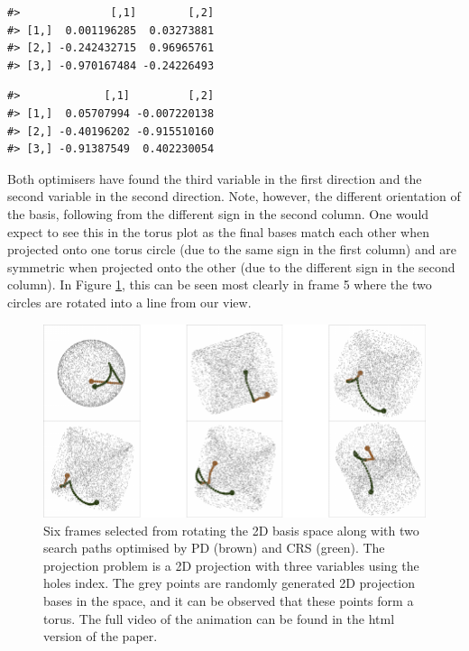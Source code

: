 \begin{verbatim}
#>              [,1]        [,2]
#> [1,]  0.001196285  0.03273881
#> [2,] -0.242432715  0.96965761
#> [3,] -0.970167484 -0.24226493
\end{verbatim}

\begin{verbatim}
#>             [,1]         [,2]
#> [1,]  0.05707994 -0.007220138
#> [2,] -0.40196202 -0.915510160
#> [3,] -0.91387549  0.402230054
\end{verbatim}

Both optimisers have found the third variable in the first direction and the second variable in the second direction. Note, however, the different orientation of the basis, following from the different sign in the second column. One would expect to see this in the torus plot as the final bases match each other when projected onto one torus circle (due to the same sign in the first column) and are symmetric when projected onto the other (due to the different sign in the second column). In Figure \ref{fig:toy-torus}, this can be seen most clearly in frame 5 where the two circles are rotated into a line from our view.

\begin{figure}

{\centering \includegraphics[width=1\linewidth]{figs/toy-torus-1} 

}

\caption{Six frames selected from rotating the 2D basis space along with two search paths optimised by PD (brown) and CRS (green). The projection problem is a 2D projection with three variables using the holes index. The grey points are randomly generated 2D projection bases in the space, and it can be observed that these points form a torus. The full video of the animation can be found in the html version of the paper.}\label{fig:toy-torus}
\end{figure}

